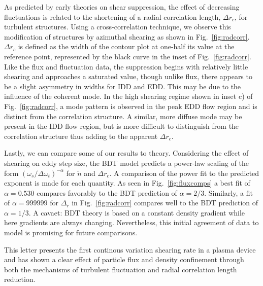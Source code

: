 \documentclass[%
 aps,
 prl,
 amsmath,amssymb,
 reprint,%
]{revtex4-1}
\begin{document}
As predicted by early theories on shear suppression, the effect of decreasing fluctuations is related to the shortening of a radial correlation length, $\Delta r_{c}$, for turbulent structures. Using a cross-correlation technique, we observe this modification of structures by azimuthal shearing as shown in Fig.~\ref{fig:radcorr}. $\Delta r_{c}$ is defined as the width of the contour plot at one-half its value at the reference point, represented by the black curve in the inset of Fig.~\ref{fig:radcorr}. Like the flux and fluctuation data, the suppression begins with relatively little shearing and approaches a saturated value, though unlike flux, there appears to be a slight asymmetry in widths for IDD and EDD. This may be due to the influence of the coherent mode. In the high shearing regime shown in inset c) of Fig.~\ref{fig:radcorr}, a mode pattern is observed in the peak EDD flow region and is distinct from the correlation structure. A similar, more diffuse mode may be present in the IDD flow region, but is more difficult to distinguish from the correlation structure thus adding to the apparent $\Delta r_{c}$.

Lastly, we can compare some of our results to theory. Considering the effect of shearing on eddy step size, the BDT model \cite{biglari90} predicts a power-law scaling of the form $\left(\omega_{s}/\Delta \omega_{t}\right)^{-\alpha}$ for $\tilde{n}$ and $\Delta r_{c}$. A comparison of the power fit to the predicted exponent is made for each quantity. As seen in Fig.~\ref{fig:fluxcomps} a best fit of $\alpha = 0.530$ compares favorably to the BDT prediction of $\alpha = 2/3$. Similarly, a fit of $\alpha = 999999$ for $\Delta_{r}$ in Fig.~\ref{fig:radcorr} compares well to the BDT prediction of $\alpha = 1/3$. A cavaet: BDT theory is based on a constant density gradient while here gradients are always changing. Nevertheless, this initial agreement of data to model is promising for future comparisons.



This letter presents the first continous variation shearing rate in a plasma device and has shown a clear effect of particle flux and density confinement through both the mechanisms of turbulent fluctuation and radial correlation length reduction.

\end{document}
